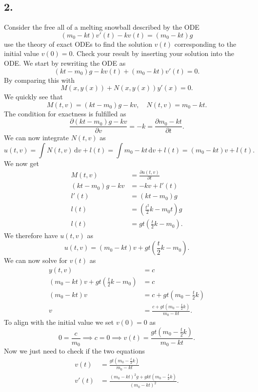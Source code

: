 \subsection*{2.} Consider the free all of a melting snowball described by the ODE
\[ 
\left( m_0 - kt \right) v'(t) - kv(t) = \left( m_0 - kt \right)g
\]
use the theory of exact ODEs to find the solution $v(t)$ corresponding to the initial value $v(0) = 0$. Check your result by inserting your solution into the ODE.
\bigbreak
We start by rewriting the ODE as
\[ 
\left( kt-m_0 \right)g - kv(t) + \left( m_0 - kt \right)v'(t) = 0
.\]
By comparing this with
\[ 
M(x, y(x)) + N(x, y(x))y'(x) = 0
.\]
We quickly see that
\[ 
M(t, v) = (kt-m_0)g - kv, \quad N(t, v) = m_0 - kt
.\]
The condition for exactness is fulfilled as
\[ 
\frac{\partial (kt - m_0)g - kv}{\partial v} = -k = \frac{\partial m_0 - kt}{\partial t} 
.\]
We can now integrate $N(t, v)$ as
\[ 
u(t, v)  =\int N(t,v) \, \mathrm{d}v + l(t) = \int m_0 - kt \, \mathrm{d}v + l(t) = \left( m_0 - kt \right)v + l(t)
.\]
We now get
\begin{align*}
  M(t,v) &= \frac{\partial u(t,v)}{\partial t} \\
  (kt - m_0) g - kv &= -kv + l'(t) \\
  l'(t) &= \left( kt - m_0 \right)g \\
  l(t) &= \left( \frac{t^2}{2} k - m_0 t \right)g \\
  l(t) &= gt \left( \frac{t}{2}k - m_0 \right)
.\end{align*}
We therefore have $u(t,v)$ as
\[ 
u(t,v) = \left( m_0 - kt \right)v + gt \left( \frac{t}{2}k - m_0 \right)
.\]
We can now solve for $v(t)$ as
\begin{align*}
  y(t,v) &= c \\
  \left( m_0 - kt \right)v + gt \left( \frac{t}{2}k - m_0 \right) &= c \\
  \left( m_0 - kt \right)v &= c + gt \left( m_0 - \frac{t}{2}k \right) \\
  v &= \frac{c + gt \left( m_0 - \frac{t}{2}k \right)}{m_0 - kt}
.\end{align*}
To align with the initial value we set $v(0) = 0$ as
\[ 
0 = \frac{c}{m_0} \implies c = 0 \implies v(t) = \frac{gt \left( m_0 - \frac{t}{2}k \right)}{m_0 - kt}
.\]
Now we just need to check if the two equations
\begin{align*}
  v(t) &= \frac{gt \left( m_0 - \frac{t}{2}k \right)}{m_0 - kt} \\
  v'(t) &= \frac{\left( m_0 - kt \right)^2g + gkt \left( m_0 - \frac{t}{2}k \right)}{\left( m_0 - kt \right)^2}
.\end{align*}
